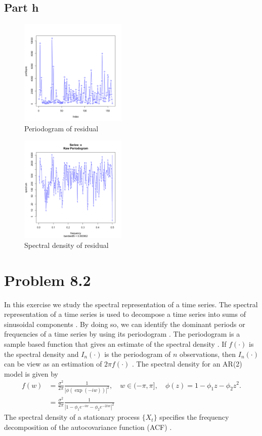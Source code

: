\documentclass[11pt, oneside]{article}   	%
\begin{document}
 \subsection{Part h}
 \begin{figure}[H] %
    \centering
    \includegraphics[width=2in]{residualPer.png} 
    \caption{Periodogram of residual}
    \label{fig:resper}
 \end{figure}
 
  \begin{figure}[H] %
    \centering
    \includegraphics[width=2in]{residualSpec.png} 
    \caption{Spectral density of residual}
    \label{fig:specr}
 \end{figure}
 
 
 \section{Problem 8.2}
 In this exercise we study the spectral representation of a time series. The spectral representation of a time series is used to decompose a time series into sums of sinusoidal components \cite{petter}. By doing so, we can identify the dominant periods or frequencies of a time series by using its periodogram \cite{penn}. The periodogram is a sample based function that gives an estimate of the spectral density \cite{petter}. If $f(\cdot)$ is the spectral density and $I_{n}(\cdot)$ is the periodogram of $n$ observations, then $I_{n}(\cdot)$ can be view as an estimation of $2\pi f(\cdot)$ \cite{petter}.
\justify 
The spectral density for an AR(2) model is given by 
 \begin{equation}
 \begin{split}
 f(w) &= \frac{\sigma^{2}}{2\pi} \frac{1}{| \phi(\exp(-iw))|^{2}}, \quad w \in (-\pi, \pi], \quad \phi(z) = 1-\phi_{1}z - \phi_{2}z^{2}.\\
        &=\frac{\sigma^{2}}{2\pi} \frac{1}{|1-\phi_{1}e^{-iw} - \phi_{2}e^{-2iw} |^{2}}
 \end{split}
 \end{equation}
 The spectral density of a stationary process $\{X_{t}\}$ specifies the frequency decomposition of the autocovariance function (ACF) \cite{petter}.
\end{document}
